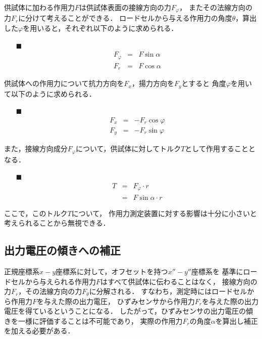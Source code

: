 \documentclass[twocolumn,a4j]{jsarticle}
\begin{document}
供試体に加わる作用力$F$は供試体表面の接線方向の力$F_\varphi$，
またその法線方向の力$F_r$に分けて考えることができる．
ロードセルから与える作用力の角度$\theta$，算出した$\varphi$を用いると，それぞれ以下のように求められる．

\begin{itemize}
    \item [$\blacksquare$] 
          \begin{eqnarray*}
              F_\varphi &=& F \sin \alpha \\
              F_r &=& F \cos \alpha
          \end{eqnarray*}
\end{itemize}

供試体への作用力について抗力方向を$F_x$，揚力方向を$F_y$とすると
角度$\varphi$を用いて以下のように求められる．

\begin{itemize}
    \item [$\blacksquare$] 
          \begin{eqnarray*}
              F_x &=& - F_r \cos \varphi\\
              F_y &=& - F_r \sin \varphi
          \end{eqnarray*}
\end{itemize}

また，接線方向成分$F_\varphi$について，供試体に対してトルク$T$として作用することとなる．

\begin{itemize}
    \item [$\blacksquare$] 
          \begin{eqnarray*}
              T &=& F_\varphi \cdot r\\
              &=& F \sin \alpha \cdot r
          \end{eqnarray*}
\end{itemize}

ここで，このトルク$T$について，
作用力測定装置に対する影響は十分に小さいと考えられることから無視できる．\\

\newpage

\subsection{出力電圧の傾きへの補正}

正規座標系$x-y$座標系に対して，オフセットを持つ$x''-y''$座標系を
基準にロードセルから与えられる作用力$F$はすべて供試体に伝わることはなく，
接線方向の力$F_r$，その法線方向の力$F_\theta$に分解される．
すなわち，測定時にはロードセルから作用力$F$を与えた際の出力電圧，
ひずみセンサから作用力$F_r$を与えた際の出力電圧を得ているということになる．
したがって，ひずみセンサの出力電圧の傾きを一様に評価することは不可能であり，
実際の作用力$F_r$の角度$\alpha$を算出し補正を加える必要がある．\par
\end{document}
